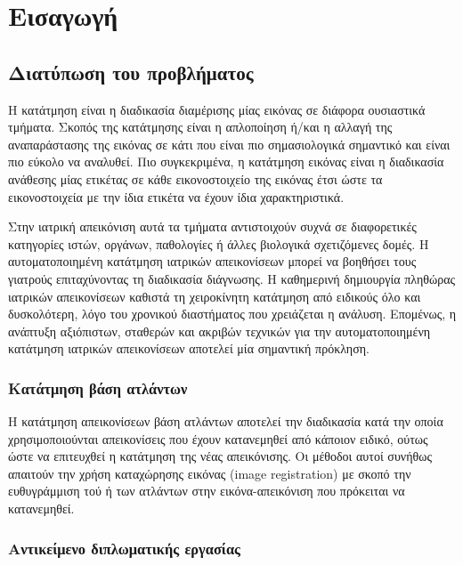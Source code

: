 \documentclass[a4paper,12pt]{article}
\begin{document}
\tableofcontents

\listoffigures

\section{Εισαγωγή}

\subsection{Διατύπωση του προβλήματος}

Η κατάτμηση είναι η διαδικασία διαμέρισης μίας εικόνας σε διάφορα ουσιαστικά
τμήματα. Σκοπός της κατάτμησης είναι η απλοποίηση ή/και η αλλαγή της
αναπαράστασης της εικόνας σε κάτι που είναι πιο σημασιολογικά σημαντικό και
είναι πιο εύκολο να αναλυθεί. Πιο συγκεκριμένα, η κατάτμηση εικόνας είναι η
διαδικασία ανάθεσης μίας ετικέτας σε κάθε εικονοστοιχείο της εικόνας έτσι ώστε
τα εικονοστοιχεία με την ίδια ετικέτα να έχουν ίδια χαρακτηριστικά.

Στην ιατρική απεικόνιση αυτά τα τμήματα αντιστοιχούν συχνά σε διαφορετικές
κατηγορίες ιστών, οργάνων, παθολογίες ή άλλες βιολογικά σχετιζόμενες δομές. Η
αυτοματοποιημένη κατάτμηση ιατρικών απεικονίσεων μπορεί να βοηθήσει τους
γιατρούς επιταχύνοντας τη διαδικασία διάγνωσης. Η καθημερινή δημιουργία πληθώρας
ιατρικών απεικονίσεων καθιστά τη χειροκίνητη κατάτμηση από ειδικούς όλο και
δυσκολότερη, λόγο του χρονικού διαστήματος που χρειάζεται η ανάλυση. Επομένως, η
ανάπτυξη αξιόπιστων, σταθερών και ακριβών τεχνικών για την αυτοματοποιημένη
κατάτμηση ιατρικών απεικονίσεων αποτελεί μία σημαντική πρόκληση.

\subsubsection{Κατάτμηση βάση ατλάντων}

Η κατάτμηση απεικονίσεων βάση ατλάντων αποτελεί την διαδικασία κατά την οποία
χρησιμοποιούνται απεικονίσεις που έχουν κατανεμηθεί από κάποιον ειδικό, ούτως
ώστε να επιτευχθεί η κατάτμηση της νέας απεικόνισης. Οι μέθοδοι αυτοί συνήθως
απαιτούν την χρήση καταχώρησης εικόνας (image registration) με σκοπό την
ευθυγράμμιση τού ή των ατλάντων στην εικόνα-απεικόνιση που πρόκειται να
κατανεμηθεί.

\subsubsection{Αντικείμενο διπλωματικής εργασίας}
\end{document}
